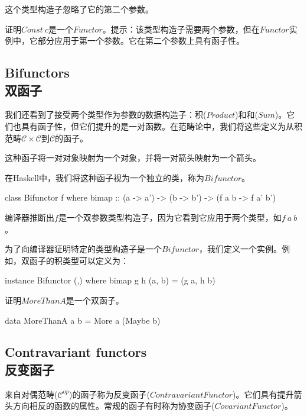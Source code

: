 \documentclass[DaoFP]{subfiles}
\begin{document}
    这个类型构造子忽略了它的第二个参数。

    \begin{exercise}
        证明$Const\ c$是一个$Functor$。提示：该类型构造子需要两个参数，但在$Functor$实例中，它部分应用于第一个参数。它在第二个参数上具有函子性。
    \end{exercise}

    \subsection{Bifunctors\\双函子}

    我们还看到了接受两个类型作为参数的数据构造子：积($Product$)和和($Sum$)。它们也具有函子性，但它们提升的是一对函数。在范畴论中，我们将这些定义为从积范畴$\mathcal{C} \times \mathcal{C}$到$\mathcal{C}$的函子。

    这种函子将一对对象映射为一个对象，并将一对箭头映射为一个箭头。

    在Haskell中，我们将这种函子视为一个独立的类，称为$Bifunctor$。

    \begin{haskell}
        class Bifunctor f where
        bimap :: (a -> a') -> (b -> b') -> (f a b -> f a' b')
    \end{haskell}

    编译器推断出$f$是一个双参数类型构造子，因为它看到它应用于两个类型，如$f\ a\ b$。

    为了向编译器证明特定的类型构造子是一个$Bifunctor$，我们定义一个实例。例如，双函子的积类型可以定义为：

    \begin{haskell}
        instance Bifunctor (,) where
        bimap g h (a, b) = (g a, h b)
    \end{haskell}

    \begin{exercise}
        证明$MoreThanA$是一个双函子。
        \begin{haskell}
            data MoreThanA a b = More a (Maybe b)
        \end{haskell}
    \end{exercise}

    \subsection{Contravariant functors\\反变函子}

    来自对偶范畴($\mathcal{C}^{op}$)的函子称为反变函子($Contravariant Functor$)。它们具有提升箭头方向相反的函数的属性。常规的函子有时称为协变函子($Covariant Functor$)。
\end{document}
